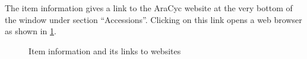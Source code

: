 The item information gives a link to the AraCyc website at the very bottom of the window under section ``Accessions''.
Clicking on this link opens a web browser as shown in \ref{fig:aracyc_info_website}.
\begin{figure}[H]
\centering
{}
\label{fig:aracyc_info_website}
\caption[optional]{Item information and its links to websites}
\end{figure}

